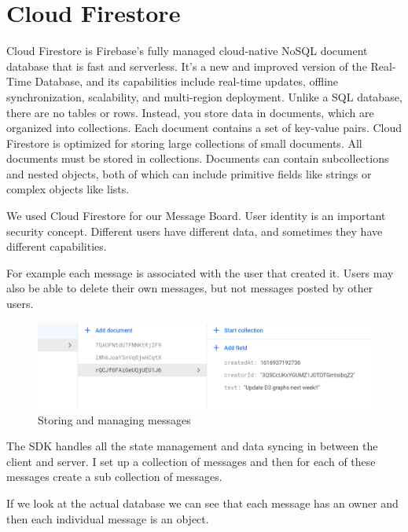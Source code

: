 \section{Cloud Firestore}
Cloud Firestore is Firebase's fully managed cloud-native NoSQL document database that is fast and serverless. It's a new and improved version of the Real-Time Database, and its capabilities include real-time updates, offline synchronization, scalability, and multi-region deployment. Unlike a SQL database, there are no tables or rows. Instead, you store data in documents, which are organized into collections. Each document contains a set of key-value pairs.
Cloud Firestore is optimized for storing large collections of small documents.
All documents must be stored in collections. Documents can contain subcollections and nested objects, both of which can include primitive fields like strings or complex objects like lists.\cite{firestore}

\vspace{6mm}

We used Cloud Firestore for our Message Board.
User identity is an important security concept. Different users have different data, and sometimes they have different capabilities.

For example each message is associated with the user that created it. Users may also be able to delete their own messages, but not messages posted by other users.

\begin{figure}[ht]
    \centering
    \includegraphics[scale=0.6]{img/FirestoreMessage.PNG}
    \caption{Storing and managing messages}
    \label{fig:my_labe6}
\end{figure}

The SDK handles all the state management and data syncing in between the client and server. I set up a collection of messages and then for each of these messages create a sub collection of messages.

\vspace{5mm}

If we look at the actual database we can see that each message has an owner and then each individual message is an object.

